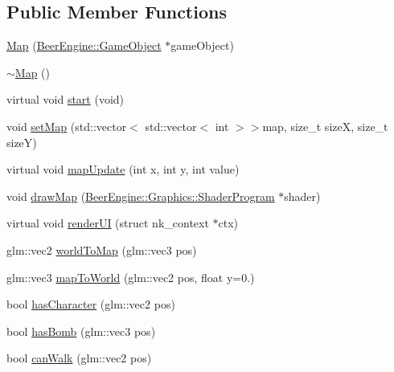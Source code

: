 \subsection*{Public Member Functions}
\begin{DoxyCompactItemize}
\item 
\mbox{\hyperlink{class_game_1_1_component_1_1_map_acf6edbdd27dc4bc20c47718bcdf9cb3d}{Map}} (\mbox{\hyperlink{class_beer_engine_1_1_game_object}{Beer\+Engine\+::\+Game\+Object}} $\ast$game\+Object)
\item 
\mbox{\hyperlink{class_game_1_1_component_1_1_map_a275fd057bb57bdfc5c35651d8cc3a464}{$\sim$\+Map}} ()
\item 
virtual void \mbox{\hyperlink{class_game_1_1_component_1_1_map_a76e2153b5f69646ba7cf77b6cd0f5096}{start}} (void)
\item 
void \mbox{\hyperlink{class_game_1_1_component_1_1_map_aaa3da00869732537ac17430774fd8357}{set\+Map}} (std\+::vector$<$ std\+::vector$<$ int $>$$>$map, size\+\_\+t sizeX, size\+\_\+t sizeY)
\item 
virtual void \mbox{\hyperlink{class_game_1_1_component_1_1_map_ae1900809e3369230a8dd3678a397ba98}{map\+Update}} (int x, int y, int value)
\item 
void \mbox{\hyperlink{class_game_1_1_component_1_1_map_ace1c03291889d1240e2c531496878c9f}{draw\+Map}} (\mbox{\hyperlink{class_beer_engine_1_1_graphics_1_1_shader_program}{Beer\+Engine\+::\+Graphics\+::\+Shader\+Program}} $\ast$shader)
\item 
virtual void \mbox{\hyperlink{class_game_1_1_component_1_1_map_af062dd2c3e677c1d3d9204cac8508dde}{render\+UI}} (struct nk\+\_\+context $\ast$ctx)
\item 
glm\+::vec2 \mbox{\hyperlink{class_game_1_1_component_1_1_map_a0d11f1fd95d17f380ffdc65e7ef9dec9}{world\+To\+Map}} (glm\+::vec3 pos)
\item 
glm\+::vec3 \mbox{\hyperlink{class_game_1_1_component_1_1_map_ad138a7749f15feeba72af1707befc6ff}{map\+To\+World}} (glm\+::vec2 pos, float y=0.)
\item 
bool \mbox{\hyperlink{class_game_1_1_component_1_1_map_a9d6733cf76fdff6d66c5154f43c688ea}{has\+Character}} (glm\+::vec2 pos)
\item 
bool \mbox{\hyperlink{class_game_1_1_component_1_1_map_ad0e98473333fa6cc7d153802b7669b34}{has\+Bomb}} (glm\+::vec3 pos)
\item 
bool \mbox{\hyperlink{class_game_1_1_component_1_1_map_a58dde006ce5b554a6ac63dc59bb480e1}{can\+Walk}} (glm\+::vec2 pos)
\item 
$$
\end{DoxyCompactItemize}
